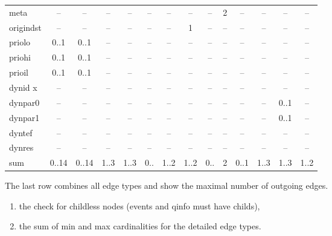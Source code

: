 \begin{table}
\begin{adjustwidth}{-15mm}{}
\begin{tabular}[t]{|l|c|c|c|c|c|c|c|c|c|c|c|c|c|}
meta             & --         & --              & --        & --         & --           & --        & --          & --        & 2          & --               & --          & --        & --        \\
origindst        & --         & --              & --        & --         & --           & --        & 1           & --        & --         & --               & --          & --        & --        \\
priolo           & 0..1       & 0..1            & --        & --         & --           & --        & --          & --        & --         & --               & --          & --        & --        \\
priohi           & 0..1       & 0..1            & --        & --         & --           & --        & --          & --        & --         & --               & --          & --        & --        \\
prioil           & 0..1       & 0..1            & --        & --         & --           & --        & --          & --        & --         & --               & --          & --        & --        \\
dynid x          & --         & --              & --        & --         & --           & --        & --          & --        & --         & --               & --          & --        & --        \\
dynpar0          & --         & --              & --        & --         & --           & --        & --          & --        & --         & --               & --          & 0..1      & --        \\
dynpar1          & --         & --              & --        & --         & --           & --        & --          & --        & --         & --               & --          & 0..1      & --        \\
dyntef           & --         & --              & --        & --         & --           & --        & --          & --        & --         & --               & --          & --        & --        \\
dynres           & --         & --              & --        & --         & --           & --        & --          & --        & --         & --               & --          & --        & --        \\
\hline
sum              & 0..14      & 0..14           & 1..3      & 1..3       & 0..          & 1..2      & 1..2        & 0..       & 2          & 0..1             & 1..3        & 1..3      & 1..2      \\
\hline
\end{tabular}
\end{adjustwidth}
\end{table}
The last row combines all edge types and show the maximal number of outgoing edges.
\begin{enumerate}
\item the check for childless nodes (events and qinfo must have childs),
\item the sum of min and max cardinalities for the detailed edge types.
\end{enumerate}

